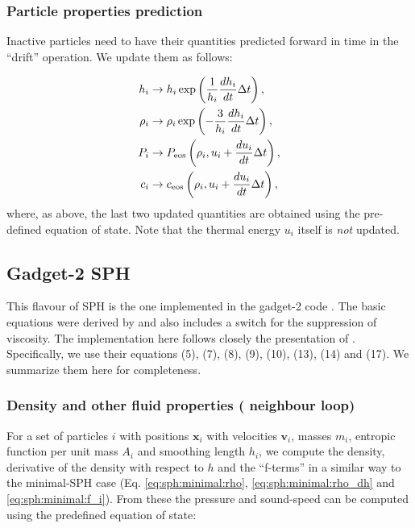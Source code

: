 \documentclass[fleqn, usenatbib, useAMS, a4paper]{mnras}
\newcommand{\gadget}{{\sc gadget}\xspace}
\renewcommand{\vec}[1]{{\mathbf{#1}}}
\begin{document}
\subsubsection{Particle properties prediction}

Inactive particles need to have their quantities predicted forward in
time in the ``drift'' operation. We update them as follows:

\begin{align}
  h_i &\rightarrow h_i \exp\left(\frac{1}{h_i} \frac{dh_i}{dt}
  \Delta t\right), \label{eq:sph:minimal:drift_h}\\
  \rho_i &\rightarrow \rho_i \exp\left(-\frac{3}{h_i} \frac{dh_i}{dt}
  \Delta t\right), \label{eq:sph:minimal:drift_rho} \\
  P_i &\rightarrow P_{\rm eos}\left(\rho_i, u_i + \frac{du_i}{dt} \Delta t\right), \label{eq:sph:minimal:drift_P}\\
  c_i &\rightarrow c_{\rm eos}\left(\rho_i, u_i + \frac{du_i}{dt}
  \Delta t\right) \label{eq:sph:minimal:drift_c},
\end{align}
where, as above, the last two updated quantities are obtained using
the pre-defined equation of state. Note that the thermal energy $u_i$
itself is \emph{not} updated.

\subsection{Gadget-2 SPH}
\label{sec:sph:gadget2}

This flavour of SPH is the one implemented in the \gadget-2 code
\citep{Springel2005}. The basic equations were derived by
\cite{Springel2002} and also includes a \cite{Balsara1995} switch for
the suppression of viscosity. The implementation here follows closely the
presentation of \cite{Springel2005}. Specifically, we use their equations (5), (7),
(8), (9), (10), (13), (14) and (17). We summarize them here for completeness.

\subsubsection{Density and other fluid properties ( neighbour loop)}

For a set of particles $i$ with positions $\vec{x}_i$ with velocities
$\vec{v}_i$, masses $m_i$, entropic function per unit mass $A_i$ and
smoothing length $h_i$, we compute the density, derivative of the density with respect
to $h$ and the ``f-terms'' in a similar way to the minimal-SPH case
(Eq. \ref{eq:sph:minimal:rho}, \ref{eq:sph:minimal:rho_dh} and
\ref{eq:sph:minimal:f_i}). From these the pressure and sound-speed can
be computed using the predefined equation of state:
\end{document}
